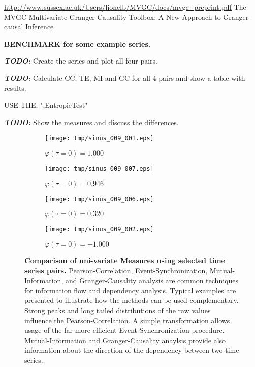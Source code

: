 \documentclass[a4paper,10pt]{scrbook}
\begin{document}
\url{http://www.sussex.ac.uk/Users/lionelb/MVGC/docs/mvgc_preprint.pdf}
The MVGC Multivariate Granger Causality Toolbox:
A New Approach to Granger-causal Inference

\textbf{BENCHMARK for some example series.}


\textbf{\textit{TODO:}} Create the series and plot all four pairs.


\textbf{\textit{TODO:}} Calculate CC, TE, MI and GC for all 4 pairs and show a table with results. 

USE THE: ",EntropieTest"







\textbf{\textit{TODO:}} Show the measures and discuss the differences.
 
\begin{figure}[ht!]
\centering
	\begin{minipage}[t]{0.45\textwidth}
		\begin{figure}[H]
		\texttt{[image: tmp/sinus\_009\_001.eps]}
		\caption*{$\varphi(\tau=0) = 1.000$}
		\end{figure}
	\end{minipage}
	\begin{minipage}[t]{0.45\textwidth}
		\begin{figure}[H]
		\texttt{[image: tmp/sinus\_009\_007.eps]}
		\caption*{$\varphi(\tau=0) = 0.946$}
		\end{figure}
	\end{minipage}	


	\begin{minipage}[t]{0.45\textwidth}
		\begin{figure}[H]
		\texttt{[image: tmp/sinus\_009\_006.eps]}
		\caption*{$\varphi(\tau=0) = 0.320$}
		\end{figure}
	\end{minipage}	
	\begin{minipage}[t]{0.45\textwidth}
		\begin{figure}[H]
		\texttt{[image: tmp/sinus\_009\_002.eps]}
		\caption*{$\varphi(\tau=0) = -1.000$}
		\end{figure}
	\end{minipage}	
	
\caption{\textbf{Comparison of uni-variate Measures using selected time series pairs.} Pearson-Correlation, Event-Synchronization, Mutual-Information, and Granger-Causality analysis are common techniques for information flow and dependency analysis. Typical examples are presented to illustrate how the methods can be used complementary. Strong peaks and long tailed distributions of the raw values influence the Pearson-Correlation. A simple transformation allows usage of the far more efficient Event-Synchronization procedure. Mutual-Information and Granger-Causality anaylsis provide also information about the direction of the dependency between two time series.}

\end{figure}
\end{document}
